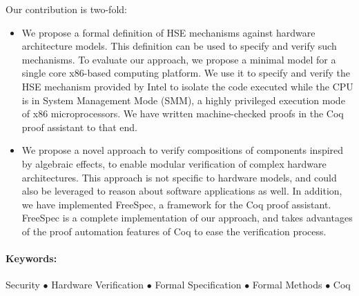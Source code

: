 Our contribution is two-fold:
%
\begin{itemize}
\item We propose a formal definition of HSE mechanisms against hardware
  architecture models. This definition can be used to specify and verify such mechanisms.
  To evaluate our approach, we propose a minimal model for a single core
  x86-based computing platform.
  We use it to specify and verify the HSE mechanism provided by Intel to isolate
  the code executed while the CPU is in System Management Mode (SMM), a highly
  privileged execution mode of x86 microprocessors.
  We have written machine-checked proofs in the Coq proof assistant to that
  end.
\item We propose a novel approach to verify compositions of components inspired
  by algebraic effects, to enable modular verification of complex hardware
  architectures. 
  This approach is not specific to hardware models, and could also be leveraged
  to reason about software applications as well.
  In addition, we have implemented FreeSpec, a framework for the Coq proof
  assistant. 
  FreeSpec is a complete implementation of our approach, and takes advantages of
  the proof automation features of Coq to ease the verification process. 
\end{itemize}

\paragraph{Keywords:}
%
Security $\bullet$ Hardware Verification $\bullet$ Formal Specification
$\bullet$ Formal Methods $\bullet$ Coq
